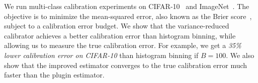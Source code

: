 We run multi-class calibration experiments on CIFAR-10~\cite{krizhevsky2009learningmultiple} and ImageNet~\cite{deng2009imagenet}.
The objective is to minimize the mean-squared error, also known as the Brier score~\cite{brier1950verification}, subject to a calibration error budget.
We show that the variance-reduced calibrator achieves a better calibration error than histogram binning, while allowing us to measure the true calibration error.
For example, we get a \emph{35\% lower calibration error on CIFAR-10} than histogram binning if $B = 100$.
We also show that the improved estimator converges to the true calibration error much faster than the plugin estimator.


